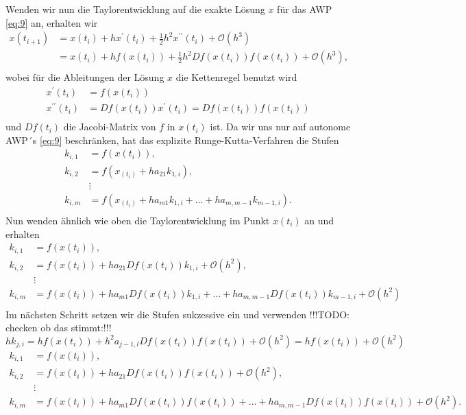 Wenden wir nun die Taylorentwicklung auf die exakte Lösung $x$ für das AWP \eqref{eq:9} an, erhalten wir
\begin{align*}
    x(t_{i+1}) &= x(t_i) + hx^{\prime}(t_i) + \frac{1}{2} h^2 x^{\prime \prime}(t_i) + \mathcal{O}(h^3) \\
    &= x(t_i) + hf(x(t_i)) + \frac{1}{2} h^2 Df(x(t_i)) f(x(t_i)) + \mathcal{O}(h^3),\\
\end{align*}
wobei für die Ableitungen der Lösung $x$ die Kettenregel benutzt wird
\begin{align*}
    x^{\prime}(t_i) &= f(x(t_i))\\
    x^{\prime \prime}(t_i) &= Df(x(t_i))x^{\prime}(t_i) = Df(x(t_i))f(x(t_i))\\
\end{align*}
und $Df(t_i)$ die Jacobi-Matrix von $f$ in $x(t_i)$ ist. Da wir uns nur auf autonome AWP´s \eqref{eq:9} beschränken, hat
das explizite Runge-Kutta-Verfahren die Stufen
\begin{align*}
    k_{i,1} &= f(x(t_i)), \\
    k_{i,2} &= f(x_(t_i) + ha_{21}k_{1,i}), \\
    &\vdots\\
    k_{i,m} &= f(x_(t_i) + ha_{m1}k_{1,i} + \dots + ha_{m,m-1}k_{m-1,i}).\\
\end{align*}
Nun wenden ähnlich wie oben die Taylorentwicklung im Punkt $x(t_i)$ an und erhalten
\begin{align*}
    k_{i,1} &= f(x(t_i)), \\
    k_{i,2} &= f(x(t_i)) + ha_{21}Df(x(t_i))k_{1,i} + \mathcal{O}(h^2), \\
    &\vdots\\
    k_{i,m} &= f(x(t_i)) + ha_{m1}Df(x(t_i))k_{1,i} + \dots + ha_{m,m-1}Df(x(t_i))k_{m-1,i} + \mathcal{O}(h^2) \\
\end{align*}
Im nächsten Schritt setzen wir die Stufen sukzessive ein und verwenden !!!TODO: checken ob das stimmt:!!!
\[
    h k_{j,i} = hf(x(t_i)) + h^2 a_{j-1,l}Df(x(t_i))f(x(t_i)) + \mathcal{O}(h^2) = hf(x(t_i)) + \mathcal{O}(h^2)
\]
\begin{align*}
    k_{i,1} &= f(x(t_i)), \\
    k_{i,2} &= f(x(t_i)) + ha_{21}Df(x(t_i))f(x(t_i)) + \mathcal{O}(h^2), \\
    &\vdots\\
    k_{i,m} &= f(x(t_i)) + ha_{m1}Df(x(t_i))f(x(t_i)) + \dots + ha_{m,m-1}Df(x(t_i))f(x(t_i)) + \mathcal{O}(h^2). \\
\end{align*}
